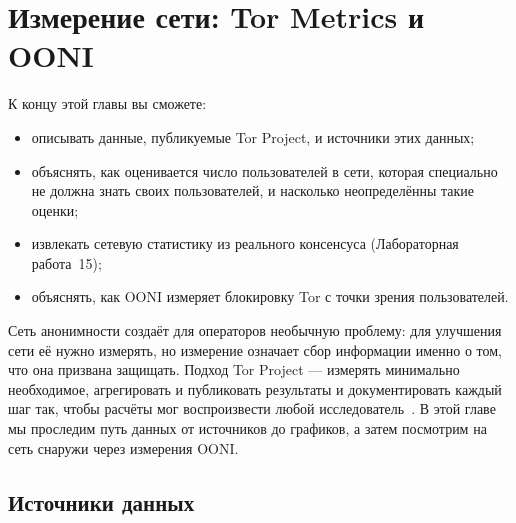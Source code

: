 \chapter{Измерение сети: Tor Metrics и OONI}\label{cap:24-metrics}

\begin{obiettivi}
К концу этой главы вы сможете:
\begin{itemize}[nosep]
  \item описывать данные, публикуемые Tor Project, и источники этих данных;
  \item объяснять, как оценивается число пользователей в сети, которая специально не должна знать своих пользователей, и насколько неопределённы такие оценки;
  \item извлекать сетевую статистику из реального консенсуса (Лабораторная работа~15);
  \item объяснять, как OONI измеряет блокировку Tor с точки зрения пользователей.
\end{itemize}
\end{obiettivi}

Сеть анонимности создаёт для операторов необычную проблему: для улучшения сети её нужно измерять, но измерение означает сбор информации именно о том, что она призвана защищать. Подход Tor Project — измерять минимально необходимое, агрегировать и публиковать результаты и документировать каждый шаг так, чтобы расчёты мог воспроизвести любой исследователь~\cite{metricsreproducible}. В этой главе мы проследим путь данных от источников до графиков, а затем посмотрим на сеть снаружи через измерения OONI.

\section{Источники данных}\label{sec:metrics-fonti}

